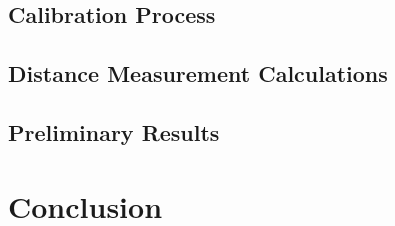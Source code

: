 \documentclass[letterpaper,12pt]{article}
\begin{document}
\subsection{Calibration Process}
\subsection{Distance Measurement Calculations}
\subsection{Preliminary Results}

\section{Conclusion}






\end{document}
